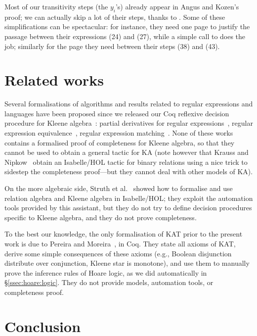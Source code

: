 \documentclass[a4paper]{llncs}
\begin{document}
Most of our transitivity steps (the $y_i$'s) already appear in Angus
and Kozen's proof; we can actually skip a lot of their steps, thanks
to . Some of these simplifications can be spectacular: for
instance, they need one page to justify the passage between their
expressions (24) and (27), while a simple call to  does the
job; similarly for the page they need between their steps (38) and
(43).

\section{Related works}
\label{sec:related:works}

Several formalisations of algorithms and results related to regular
expressions and languages have been proposed since we released our Coq
reflexive decision procedure for Kleene algebra~\cite{bp:itp10:kacoq}:
partial derivatives for regular expressions~\cite{AlmeidaMPS10},
regular expression
equivalence~\cite{CoquandS11,KraussN12,Asperti12,MoreiraPS12}, regular
expression matching~\cite{Komendantsky12}. None of these works
contains a formalised proof of completeness for Kleene algebra, so
that they cannot be used to obtain a general tactic for KA (note
however that Krauss and Nipkow~\cite{KraussN12} obtain an Isabelle/HOL
tactic for binary relations using a nice trick to sidestep the
completeness proof---but they cannot deal with other models of KA).

On the more algebraic side, Struth et
al.~\cite{FosterS12,ArmstrongS12} showed how to formalise and use
relation algebra and Kleene algebra in Isabelle/HOL; they exploit the
automation tools provided by this assistant, but they do not try to
define decision procedures specific to Kleene algebra, and they do not
prove completeness.

To the best our knowledge, the only formalisation of KAT prior to the
present work is due to Pereira and Moreira~\cite{PereiraM08}, in Coq.
They state all axioms of KAT, derive some simple consequences of these
axioms (e.g., Boolean disjunction distribute over conjunction, Kleene
star is monotone), and use them to manually prove the inference rules
of Hoare logic, as we did automatically in
§\ref{ssec:hoare:logic}. They do not provide models, automation tools,
or completeness proof.


\section{Conclusion}
\label{ccl}
\end{document}
